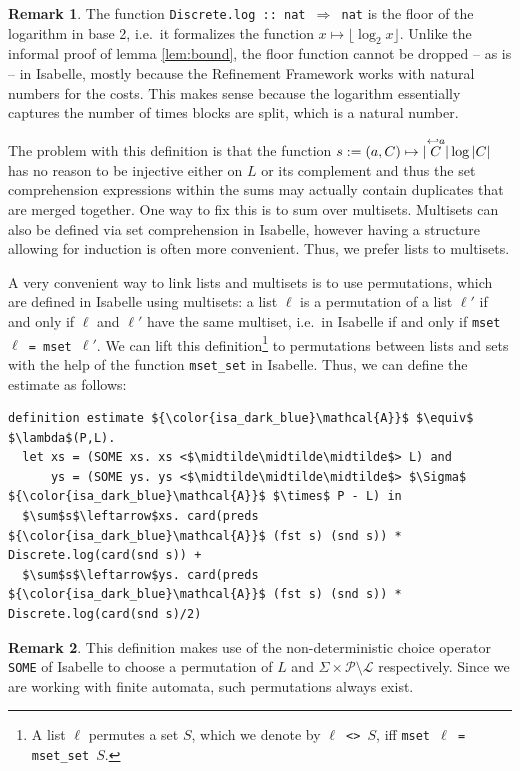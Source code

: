 \documentclass[12pt, a4 paper]{article}
\newcommand{\midtilde}{\raisebox{0.5ex}{\texttildelow}}
\theoremstyle{definition}
\newtheorem{remark}{Remark}
\begin{document}
\begin{remark}
    The function \texttt{Discrete.log :: nat $\Rightarrow$ nat} is the floor of the logarithm in base 2, i.e.\ it formalizes the function $x \mapsto \lfloor \log_2 x \rfloor$. Unlike the informal proof of lemma \ref{lem:bound}, the floor function cannot be dropped -- as is -- in Isabelle, mostly because the Refinement Framework works with natural numbers for the costs. This makes sense because the logarithm essentially captures the number of times blocks are split, which is a natural number.
\end{remark}

The problem with this definition is that the function $s := (a, C) \mapsto |\overset{\hookleftarrow {a}}{C}| \log |C|$ has no reason to be injective either on $L$ or its complement and thus the set comprehension expressions within the sums may actually contain duplicates that are merged together. One way to fix this is to sum over multisets. Multisets can also be defined via set comprehension in Isabelle, however having a structure allowing for induction is often more convenient. Thus, we prefer lists to multisets. 

\bigskip

A very convenient way to link lists and multisets is to use permutations, which are defined in Isabelle using multisets: a list $\ell$ is a permutation of a list $\ell'$ if and only if $\ell$ and $\ell'$ have the same multiset, i.e.\ in Isabelle if and only if \texttt{mset $\ell$ = mset $\ell'$}. We can lift this definition\footnote{A list $\ell$ permutes a set $S$, which we denote by \texttt{$\ell$ <\midtilde\midtilde\midtilde> $S$}, iff \texttt{mset $\ell$ = mset\_set $S$}.} to permutations between lists and sets with the help of the function \texttt{mset\_set} in Isabelle. Thus, we can define the estimate as follows:

\begin{lstlisting}[language=Isabelle]
definition estimate ${\color{isa_dark_blue}\mathcal{A}}$ $\equiv$ $\lambda$(P,L).
  let xs = (SOME xs. xs <$\midtilde\midtilde\midtilde$> L) and
      ys = (SOME ys. ys <$\midtilde\midtilde\midtilde$> $\Sigma$ ${\color{isa_dark_blue}\mathcal{A}}$ $\times$ P - L) in
  $\sum$s$\leftarrow$xs. card(preds ${\color{isa_dark_blue}\mathcal{A}}$ (fst s) (snd s)) * Discrete.log(card(snd s)) +
  $\sum$s$\leftarrow$ys. card(preds ${\color{isa_dark_blue}\mathcal{A}}$ (fst s) (snd s)) * Discrete.log(card(snd s)/2)
\end{lstlisting}

\begin{remark}
    This definition makes use of the non-deterministic choice operator \texttt{SOME} of Isabelle to choose a permutation of $L$ and $\Sigma \times \mathcal{P} \setminus \mathcal{L}$ respectively. Since we are working with finite automata, such permutations always exist.
\end{remark}
\end{document}
